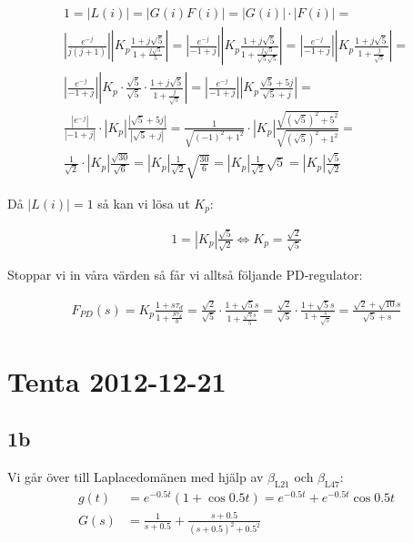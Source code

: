 \documentclass[a4paper]{article}
\newcommand{\mhb}[1]{$\beta_{\text{#1}}$}     %
\begin{document}
\begin{align*}
  1 = |L(i)| = |G(i)F(i)| = |G(i)|\cdot|F(i)| = \\
  \left | \frac{e^{-j}}{j(j+1)} \right | \left | K_p\frac{1+j\sqrt{5}}{1 + \frac{j \sqrt{5}}{5}} \right | =
  \left | \frac{e^{-j}}{-1+j} \right | \left | K_p\frac{1+j\sqrt{5}}{1 + \frac{j \sqrt{5}}{\sqrt{5}\sqrt{5}}} \right | =
  \left | \frac{e^{-j}}{-1+j} \right | \left | K_p\frac{1+j\sqrt{5}}{1 + \frac{j}{\sqrt{5}}} \right | =\\
  \left | \frac{e^{-j}}{-1+j} \right | \left | K_p \cdot \frac{\sqrt{5}}{\sqrt{5}}\cdot \frac{1+j\sqrt{5}}{1 + \frac{j}{\sqrt{5}}} \right | =
  \left | \frac{e^{-j}}{-1+j} \right | \left | K_p\frac{\sqrt{5}+5j}{\sqrt{5} + j} \right | =\\
  \frac{|e^{-j}|}{|-1+j|} \cdot |K_p| \frac{|\sqrt{5}+5j|}{|\sqrt{5} + j|} =
  \frac{1}{\sqrt{(-1)^2 + 1^2}} \cdot |K_p| \frac{\sqrt{(\sqrt{5})^2 + 5^2}}{\sqrt{(\sqrt{5})^2 + 1^2}} =\\
  \frac{1}{\sqrt{2}} \cdot |K_p| \frac{\sqrt{30}}{\sqrt{6}} =
  |K_p| \frac{1}{\sqrt{2}} \sqrt{\frac{30}{6}} =
  |K_p| \frac{1}{\sqrt{2}} \sqrt{5} =
  |K_p| \frac{\sqrt{5}}{\sqrt{2}}
\end{align*}

Då $|L(i)| = 1$ så kan vi lösa ut $K_p$:

\begin{align*}
  1 = |K_p| \frac{\sqrt{5}}{\sqrt{2}} \Longleftrightarrow K_p = \frac{\sqrt{2}}{\sqrt{5}}
\end{align*}

Stoppar vi in våra värden så får vi alltså följande PD-regulator:

\begin{align*}
  F_{PD}(s) = K_p \frac{1+s\tau_d}{1+\frac{S\tau_d}{b}} = \frac{\sqrt{2}}{\sqrt{5}} \cdot \frac{1+\sqrt{5}s}{1+\frac{\sqrt{5}s}{5}} =
  \frac{\sqrt{2}}{\sqrt{5}} \cdot \frac{1+\sqrt{5}s}{1+\frac{s}{\sqrt{5}}} = \frac{\sqrt{2}+\sqrt{10}s}{\sqrt{5} + s}
\end{align*}



\section{Tenta 2012-12-21}
%
%
\subsection{1b}
Vi går över till Laplacedomänen med hjälp av \mhb{L21} och \mhb{L47}:
\begin{align*}
  g(t) &= e^{-0.5t}(1 + \cos0.5t) = e^{-0.5t} + e^{-0.5t}\cos 0.5t\\
  G(s) &= \frac{1}{s+0.5} + \frac{s+0.5}{(s+0.5)^2 + 0.5^2}
\end{align*}
\end{document}
